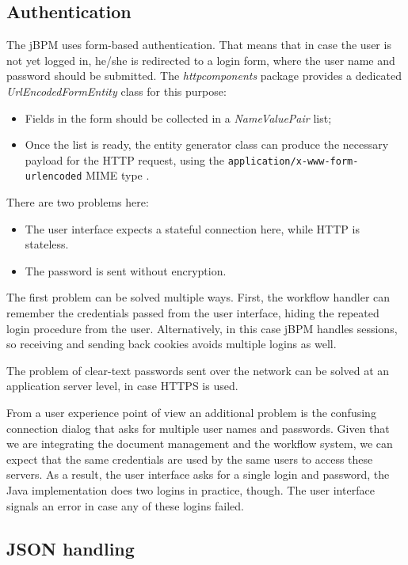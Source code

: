 \subsection{Authentication}

The jBPM uses form-based authentication. That means that in case the user is not
yet logged in, he/she is redirected to a login form, where the user name and
password should be submitted. The \emph{httpcomponents} package provides a
dedicated \emph{UrlEncodedFormEntity} class for this purpose:

\begin{itemize}
\item Fields in the form should be collected in a \emph{NameValuePair} list;
\item Once the list is ready, the entity generator class can produce the
necessary payload for the HTTP request, using the
\texttt{application/x-www-form-urlencoded} MIME type \cite{form-encoding}.
\end{itemize}

There are two problems here:

\begin{itemize}
\item The user interface expects a stateful connection here, while HTTP is stateless.
\item The password is sent without encryption.
\end{itemize}

The first problem can be solved multiple ways. First, the workflow handler can
remember the credentials passed from the user interface, hiding the repeated
login procedure from the user. Alternatively, in this case jBPM handles
sessions, so receiving and sending back cookies avoids multiple logins as well.

The problem of clear-text passwords sent over the network can be solved at an
application server level, in case HTTPS is used.

From a user experience point of view an additional problem is the confusing
connection dialog that asks for multiple user names and passwords. Given that
we are integrating the document management and the workflow system, we can
expect that the same credentials are used by the same users to access these
servers. As a result, the user interface asks for a single login and password,
the Java implementation does two logins in practice, though. The user interface
signals an error in case any of these logins failed.

\subsection{JSON handling}

